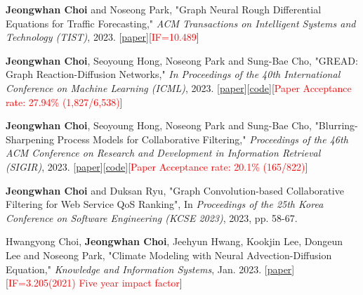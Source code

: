 \documentclass[10pt]{article}
\newenvironment{changemargin}[2]{
  \begin{list}{}{
    \setlength{\topsep}{0pt}
    \setlength{\leftmargin}{#1}
    \setlength{\rightmargin}{#2}
    \setlength{\listparindent}{\parindent}
    \setlength{\itemindent}{\parindent}
    \setlength{\parsep}{\parskip}
  }
  \item[]}{\end{list}
}
\newcommand{\presentation}[2]{
	{#1} \hfill \emph{#2}\\ \bigskip
}
\newcommand{\RED}[1]{\textcolor{red}{#1}}
\newenvironment{body} {
	\vspace*{-16pt}
	\begin{changemargin}{-0.25in}{-0.5in}
  }
	{\end{changemargin}
}
\begin{document}
\begin{body}
	\vspace{14pt}
\presentation{
\textbf{Jeongwhan Choi} and Noseong Park, "Graph Neural Rough Differential Equations for Traffic Forecasting," \emph{ACM Transactions on Intelligent Systems and Technology (TIST)}, 2023. [\href{https://dl.acm.org/doi/abs/10.1145/3604808}{paper}][\RED{IF=10.489}]}{}
\presentation{
\textbf{Jeongwhan Choi}, Seoyoung Hong, Noseong Park and Sung-Bae Cho, "GREAD: Graph Reaction-Diffusion Networks," \emph{In Proceedings of the 40th International Conference on Machine Learning (ICML)}, 2023. [\href{http://proceedings.mlr.press/v202/choi23a}{paper}][\href{https://github.com/jeongwhanchoi/GREAD}{code}][\RED{Paper Acceptance rate: 27.94\% (1,827/6,538)}]}{}
\presentation{
\textbf{Jeongwhan Choi}, Seoyoung Hong, Noseong Park and Sung-Bae Cho, "Blurring-Sharpening Process Models for Collaborative Filtering," \emph{Proceedings of the 46th ACM Conference on Research and Development in Information Retrieval (SIGIR)}, 2023. [\href{https://arxiv.org/abs/2211.09324}{paper}][\href{https://github.com/jeongwhanchoi/bspm}{code}][\RED{Paper Acceptance rate: 20.1\% (165/822)}]}{}
\presentation{
\textbf{Jeongwhan Choi} and Duksan Ryu, "Graph Convolution-based Collaborative Filtering for Web Service QoS Ranking", In \emph{Proceedings of the 25th Korea Conference on Software Engineering (KCSE 2023)}, 2023, pp. 58-67.}{}
\presentation{
Hwangyong Choi, \textbf{Jeongwhan Choi}, Jeehyun Hwang, Kookjin Lee, Dongeun Lee and Noseong Park, "Climate Modeling with Neural Advection-Diffusion Equation," \emph{Knowledge and Information Systems}, Jan. 2023. [\href{https://doi.org/10.1007/s10115-023-01829-2}{paper}] [\RED{IF=3.205(2021) Five year impact factor}]}{}


\end{body}
\end{document}
